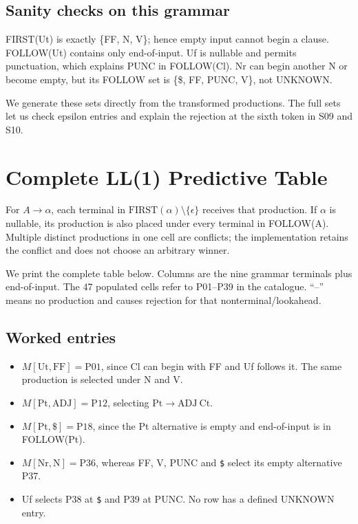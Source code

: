 \documentclass[11pt]{article}
\newcommand{\code}[1]{\texttt{#1}}
\begin{document}
\subsection*{Sanity checks on this grammar}
FIRST(Ut) is exactly \{FF, N, V\}; hence empty input cannot begin a clause.
FOLLOW(Ut) contains only end-of-input. Uf is nullable and permits punctuation,
which explains PUNC in FOLLOW(Cl). Nr can begin another N or become empty,
but its FOLLOW set is \{\$, FF, PUNC, V\}, not UNKNOWN.

We generate these sets directly from the transformed productions. The full
sets let us check epsilon entries and explain the rejection at the sixth
token in S09 and S10.

\clearpage
\section{Complete LL(1) Predictive Table}
For \(A\rightarrow\alpha\), each terminal in
\(\mathrm{FIRST}(\alpha)\setminus\{\epsilon\}\) receives that production.
If \(\alpha\) is nullable, its production is also placed under every terminal
in FOLLOW(A). Multiple distinct productions in one cell are conflicts;
the implementation retains the conflict and does not choose an arbitrary
winner.

We print the complete table below. Columns are the nine grammar terminals
plus end-of-input. The 47 populated cells refer to P01--P39 in the catalogue.
``--'' means no production and causes rejection for that nonterminal/lookahead.

{\scriptsize\setlength{\tabcolsep}{2pt}\renewcommand{\arraystretch}{1.8}
}

\subsection*{Worked entries}
\begin{itemize}
\item \(M[\mathrm{Ut},\mathrm{FF}]=\mathrm{P01}\), since Cl can begin with FF
and Uf follows it. The same production is selected under N and V.
\item \(M[\mathrm{Pt},\mathrm{ADJ}]=\mathrm{P12}\), selecting
\(\mathrm{Pt}\rightarrow\mathrm{ADJ}\ \mathrm{Ct}\).
\item \(M[\mathrm{Pt},\$]=\mathrm{P18}\), since the Pt alternative is empty
and end-of-input is in FOLLOW(Pt).
\item \(M[\mathrm{Nr},\mathrm{N}]=\mathrm{P36}\), whereas FF, V, PUNC and
\code{\$} select its empty alternative P37.
\item Uf selects P38 at \code{\$} and P39 at PUNC. No row has a defined
UNKNOWN entry.
\end{itemize}
\end{document}
